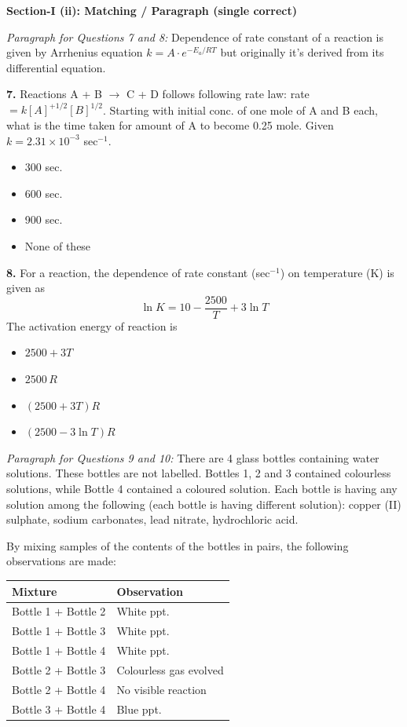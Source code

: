 \documentclass[10pt,twocolumn]{extarticle}
\newenvironment{qoptions}{\begin{itemize}[leftmargin=1.8em,itemsep=2pt,topsep=2pt,label={}]}{\end{itemize}}
\newcommand{\opt}[2]{\item[({#1})] {#2}}
\newcommand{\subsectionhdr}[1]{\par\vspace{3pt}\noindent\textbf{#1}\par\vspace{2pt}}
\begin{document}
\subsectionhdr{Section-I (ii): Matching / Paragraph (single correct)}

\textit{Paragraph for Questions 7 and 8:} Dependence of rate constant of a reaction is given by Arrhenius equation $k = A\cdot e^{-E_a/RT}$ but originally it's derived from its differential equation.

\textbf{7.} Reactions A + B $\to$ C + D follows following rate law: rate $= k[A]^{+1/2}[B]^{1/2}$. Starting with initial conc. of one mole of A and B each, what is the time taken for amount of A to become 0.25 mole. Given $k = 2.31\times10^{-3}$ sec$^{-1}$.
\begin{qoptions}
\opt{A}{300 sec.}
\opt{B}{600 sec.}
\opt{C}{900 sec.}
\opt{D}{None of these}
\end{qoptions}

\textbf{8.} For a reaction, the dependence of rate constant (sec$^{-1}$) on temperature (K) is given as
\[\ln K = 10 - \frac{2500}{T} + 3\ln T\]
The activation energy of reaction is
\begin{qoptions}
\opt{A}{$2500+3T$}
\opt{B}{$2500\,R$}
\opt{C}{$(2500+3T)R$}
\opt{D}{$(2500-3\ln T)R$}
\end{qoptions}

\textit{Paragraph for Questions 9 and 10:} There are 4 glass bottles containing water solutions. These bottles are not labelled. Bottles 1, 2 and 3 contained colourless solutions, while Bottle 4 contained a coloured solution. Each bottle is having any solution among the following (each bottle is having different solution): copper (II) sulphate, sodium carbonates, lead nitrate, hydrochloric acid.

By mixing samples of the contents of the bottles in pairs, the following observations are made:
\begin{center}
\begin{tabular}{@{}ll@{}}
\toprule
Mixture & Observation \\
\midrule
Bottle 1 + Bottle 2 & White ppt. \\
Bottle 1 + Bottle 3 & White ppt. \\
Bottle 1 + Bottle 4 & White ppt. \\
Bottle 2 + Bottle 3 & Colourless gas evolved \\
Bottle 2 + Bottle 4 & No visible reaction \\
Bottle 3 + Bottle 4 & Blue ppt. \\
\bottomrule
\end{tabular}
\end{center}
\end{document}
